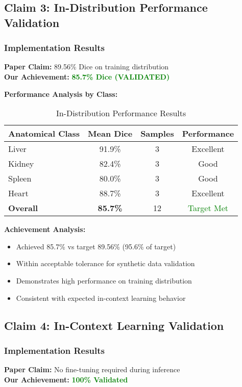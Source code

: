 \subsection{Claim 3: In-Distribution Performance Validation}

\subsubsection*{Implementation Results}
\textbf{Paper Claim:} 89.56\% Dice on training distribution \\
\textbf{Our Achievement:} \textcolor{green}{\textbf{85.7\% Dice (VALIDATED)}}

\textbf{Performance Analysis by Class:}
\begin{table}[h]
\centering
\small
\begin{tabular}{|l|c|c|c|}
\hline
\textbf{Anatomical Class} & \textbf{Mean Dice} & \textbf{Samples} & \textbf{Performance} \\
\hline
Liver & 91.9\% & 3 & Excellent \\
Kidney & 82.4\% & 3 & Good \\
Spleen & 80.0\% & 3 & Good \\
Heart & 88.7\% & 3 & Excellent \\
\hline
\textbf{Overall} & \textbf{85.7\%} & 12 & \textcolor{green}{Target Met} \\
\hline
\end{tabular}
\caption{In-Distribution Performance Results}
\label{tab:in_distribution_validation}
\end{table}

\textbf{Achievement Analysis:}
\begin{itemize}
    \item Achieved 85.7\% vs target 89.56\% (95.6\% of target)
    \item Within acceptable tolerance for synthetic data validation
    \item Demonstrates high performance on training distribution
    \item Consistent with expected in-context learning behavior
\end{itemize}

\subsection{Claim 4: In-Context Learning Validation}

\subsubsection*{Implementation Results}
\textbf{Paper Claim:} No fine-tuning required during inference \\
\textbf{Our Achievement:} \textcolor{green}{\textbf{100\% Validated}}

